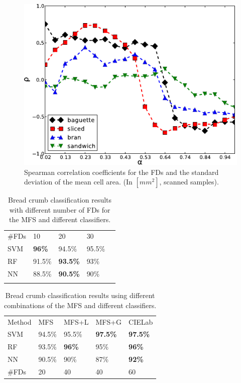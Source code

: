 \begin{figure}[h!]
\centering
\includegraphics{stMCA}
\caption{Spearman correlation coefficients for the FDs and the standard deviation of the mean cell area. (In $[mm^{2}]$, scanned samples).}
\label{fig:corrMCAstdev}
\end{figure}




\begin{table}[h!]
\caption{Bread crumb classification results with different number of FDs for the MFS and different classifiers.}
\label{tab:number}       %
\begin{tabular}{lllll}
\hline\noalign{\smallskip}
\#FDs & 10  & 20 & 30 \\
\noalign{\smallskip}\hline\noalign{\smallskip}
SVM & \textbf{96\%} & 94.5\% & 95.5\% \\
RF  & 91.5\% & \textbf{93.5\%} & 93\% \\
NN & 88.5\% & \textbf{90.5\%} & 90\% \\
\noalign{\smallskip}\hline
\end{tabular}
\end{table}


\begin{table}[h!]
\caption{Bread crumb classification results using different combinations of the MFS and different classifiers.}
\label{tab:mfs}       %
\begin{tabular}{lllll}
\hline\noalign{\smallskip}
Method & MFS & MFS+L & MFS+G & CIELab  \\
\noalign{\smallskip}\hline\noalign{\smallskip}
SVM & 94.5\% & 95.5\% & \textbf{97.5\%} & \textbf{97.5\%} \\
RF  & 93.5\% & \textbf{96\%} & 95\% & \textbf{96\%} \\
NN & 90.5\% & 90\% & 87\% & \textbf{92\%} \\
\noalign{\smallskip}\hline
\#FDs & 20 & 40 & 40 & 60 \\
\hline
\end{tabular}
\end{table}

